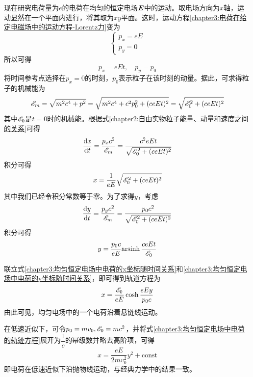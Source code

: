 现在研究电荷量为$e$的电荷在均匀的恒定电场$\boldsymbol{E}$中的运动。取电场方向为$x$轴，运动显然在一个平面内进行，将其取为$xy$平面。这时，运动方程\eqref{chapter3:电荷在给定电磁场中的运动方程-Lorentz力}变为
\begin{equation*}
\begin{cases}
	\dot{p}_x = eE \\
	\dot{p}_y = 0
\end{cases}
\end{equation*}
所以可得
\begin{equation}
	p_x = eEt,\quad p_y = p_0
	\label{chapter3:恒定电场中电荷的动量}
\end{equation}
将时间参考点选择在$p_x=0$的时刻，$p_0$表示粒子在该时刻的动量。据此，可求得粒子的机械能为
\begin{equation}
	\mathscr{E}_m = \sqrt{m^2c^4+p^2} = \sqrt{m^2c^4+c^2p_0^2+(ceEt)^2} = \sqrt{\mathscr{E}_0^2+(ceEt)^2}
	\label{chapter3:恒定电场中电荷的机械能}
\end{equation}
其中$\mathscr{E}_0$是$t=0$时的机械能。根据式\eqref{chapter2:自由实物粒子能量、动量和速度之间的关系}可得
\begin{equation*}
	\frac{\mathrm{d} x}{\mathrm{d} t} = \frac{p_xc^2}{\mathscr{E}_m} = \frac{c^2eEt}{\sqrt{\mathscr{E}_0^2+(ceEt)^2}}
\end{equation*}
积分可得
\begin{equation}
	x = \frac{1}{eE}\sqrt{\mathscr{E}_0^2+(ceEt)^2}
	\label{chapter3:均匀恒定电场中电荷的x坐标随时间关系}
\end{equation}
其中我们已经令积分常数等于零。为了求得$y$，考虑
\begin{equation*}
	\frac{\mathrm{d} y}{\mathrm{d} t} = \frac{p_yc^2}{\mathscr{E}_m} = \frac{p_0c^2}{\sqrt{\mathscr{E}_0^2+(ceEt)^2}}
\end{equation*}
积分可得
\begin{equation}
	y = \frac{p_0c}{eE}\mathrm{arsinh}\, \frac{ceEt}{\mathscr{E}_0}
	\label{chapter3:均匀恒定电场中电荷的y坐标随时间关系}
\end{equation}

联立式\eqref{chapter3:均匀恒定电场中电荷的x坐标随时间关系}和\eqref{chapter3:均匀恒定电场中电荷的y坐标随时间关系}，即可得到轨道方程为
\begin{equation}
	x = \frac{\mathscr{E}_0}{eE}\cosh \frac{eEy}{p_0c}
	\label{chapter3:均匀恒定电场中电荷的轨迹方程}
\end{equation}
由此可见，均匀电场中的一个电荷沿着悬链线运动。

在低速近似下，可令$p_0=mv_0, \mathscr{E}_0 = mc^2$，并将式\eqref{chapter3:均匀恒定电场中电荷的轨迹方程}展开为$\dfrac1c$的幂级数并略去高阶项，可得
\begin{equation*}
	x = \frac{eE}{2mv_0^2}y^2+\text{const}
\end{equation*}
即电荷在低速近似下沿抛物线运动，与经典力学中的结果一致。

